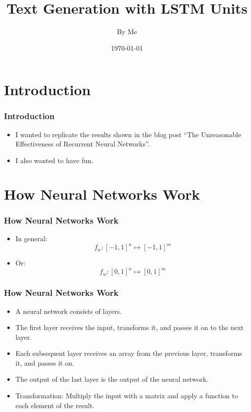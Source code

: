 \documentclass[12]{beamer}
\title{Text Generation with LSTM Units}
\author{By Me}
\date{\today}
\begin{document}
\begin{frame}
\titlepage
\end{frame}

\section{Introduction}
\begin{frame}
\frametitle{Introduction}
\begin{itemize}
\item<1-> I wanted to replicate the results shown in the blog post ``The Unreasonable Effectiveness of Recurrent Neural Networks''.
\item<2-> I also wanted to have fun.
\end{itemize}
\end{frame}


\section{How Neural Networks Work}
\begin{frame}
\frametitle{How Neural Networks Work}
\begin{itemize}
\item<1-> In general:
$$f_w:\left[-1,1\right]^n\longmapsto\left[-1,1\right]^m$$
\item<2-> Or:
$$f_w:\left[0,1\right]^n\longmapsto\left[0,1\right]^m$$
\end{itemize}
\end{frame}

\begin{frame}
\frametitle{How Neural Networks Work}
\begin{itemize}
\item<1-> A neural network consists of layers.
\item<1-> The first layer receives the input, transforms it, and passes it on to the next layer.
\item<1-> Each subsequent layer receives an array from the previous layer, transforms it, and passes it on.
\item<1-> The output of the last layer is the output of the neural network.
\item<2-> Transformation: Multiply the input with a matrix and apply a function to each element of the result.
\end{itemize}
\end{frame}
\end{document}
